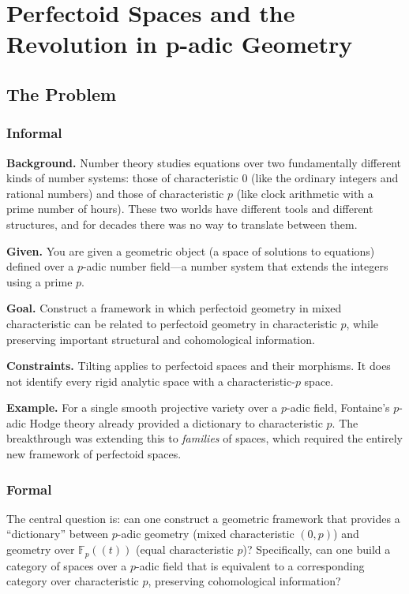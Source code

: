 \let\LocalMacro\relax

\chapter{Perfectoid Spaces and the Revolution in p-adic Geometry}

\section{The Problem}

\subsection{Informal}

\textbf{Background.} Number theory studies equations over two fundamentally different kinds of number systems: those of characteristic 0 (like the ordinary integers and rational numbers) and those of characteristic $p$ (like clock arithmetic with a prime number of hours). These two worlds have different tools and different structures, and for decades there was no way to translate between them.

\textbf{Given.} You are given a geometric object (a space of solutions to equations) defined over a $p$-adic number field---a number system that extends the integers using a prime $p$.

\textbf{Goal.} Construct a framework in which perfectoid geometry in mixed characteristic can be related to perfectoid geometry in characteristic $p$, while preserving important structural and cohomological information.

\textbf{Constraints.} Tilting applies to perfectoid spaces and their morphisms. It does not identify every rigid analytic space with a characteristic-$p$ space.

\textbf{Example.} For a single smooth projective variety over a $p$-adic field, Fontaine's $p$-adic Hodge theory already provided a dictionary to characteristic $p$. The breakthrough was extending this to \emph{families} of spaces, which required the entirely new framework of perfectoid spaces.

\subsection{Formal}

The central question is: can one construct a geometric framework that provides a ``dictionary'' between $p$-adic geometry (mixed characteristic $(0,p)$) and geometry over $\mathbb{F}_p((t))$ (equal characteristic $p$)? Specifically, can one build a category of spaces over a $p$-adic field that is equivalent to a corresponding category over characteristic $p$, preserving cohomological information?

